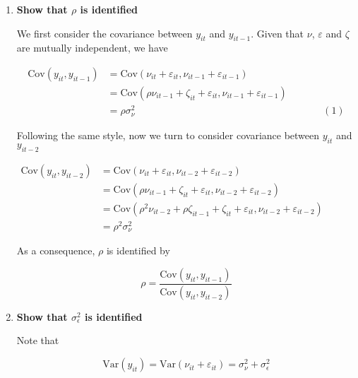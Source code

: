 \documentclass[11pt]{article}
\newcommand{\var}{\text{Var}}
\newcommand{\cov}{\text{Cov}}
\begin{document}
        \begin{enumerate}
    
            \item{\bf Show that $\rho$ is identified}
                
                We first consider the covariance between $y_{it}$ and $y_{it-1}$. Given that $\nu$, $\varepsilon$ and $\zeta$ are mutually independent, we have

                \[ \begin{aligned}
                    \cov(y_{it}, y_{it-1}) &= \cov(\nu_{it} + \varepsilon_{it}, \nu_{it-1} + \varepsilon_{it-1}) &\qquad& \\
                                              &= \cov(\rho\nu_{it-1} + \zeta_{it} + \varepsilon_{it}, \nu_{it-1} + \varepsilon_{it-1}) && \\
                                              &= \rho\sigma_\nu^2 && (\text{1})
                \end{aligned} \]

                Following the same style, now we turn to consider covariance between $y_{it}$ and $y_{it-2}$
                
                \[ \begin{aligned}
                    \cov(y_{it}, y_{it-2}) &= \cov(\nu_{it} + \varepsilon_{it}, \nu_{it-2} + \varepsilon_{it-2}) &\qquad& \\
                                              &= \cov(\rho\nu_{it-1} + \zeta_{it} + \varepsilon_{it}, \nu_{it-2} + \varepsilon_{it-2}) && \\
                                              &= \cov(\rho^2\nu_{it-2} + \rho\zeta_{it-1} + \zeta_{it} + \varepsilon_{it}, \nu_{it-2} + \varepsilon_{it-2}) && \\
                                              &= \rho^2\sigma_\nu^2
                \end{aligned} \]
                
                As a consequence, $\rho$ is identified by 

                \[
                    \rho = \frac{\cov(y_{it}, y_{it-1})}{\cov(y_{it}, y_{it-2})}
                \]

            \item{\bf Show that $\sigma_{\epsilon}^2$ is identified}
            
                Note that 

                \[
                    \var(y_{it}) = \var(\nu_{it} + \varepsilon_{it}) = \sigma_\nu^2 + \sigma_{\epsilon}^2 
                \]
                

\end{enumerate}
\end{document}

